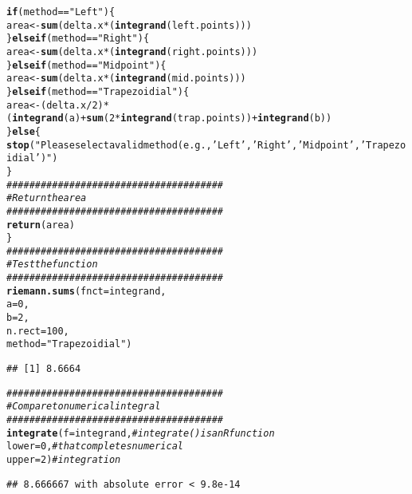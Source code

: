 \documentclass{article}\usepackage[]{graphicx}\usepackage[]{xcolor}
\makeatletter
\newcommand{\hlnum}[1]{\textcolor[rgb]{0.686,0.059,0.569}{#1}}%
\newcommand{\hlsng}[1]{\textcolor[rgb]{0.192,0.494,0.8}{#1}}%
\newcommand{\hlcom}[1]{\textcolor[rgb]{0.678,0.584,0.686}{\textit{#1}}}%
\newcommand{\hlopt}[1]{\textcolor[rgb]{0,0,0}{#1}}%
\newcommand{\hldef}[1]{\textcolor[rgb]{0.345,0.345,0.345}{#1}}%
\newcommand{\hlkwa}[1]{\textcolor[rgb]{0.161,0.373,0.58}{\textbf{#1}}}%
\newcommand{\hlkwb}[1]{\textcolor[rgb]{0.69,0.353,0.396}{#1}}%
\newcommand{\hlkwc}[1]{\textcolor[rgb]{0.333,0.667,0.333}{#1}}%
\newcommand{\hlkwd}[1]{\textcolor[rgb]{0.737,0.353,0.396}{\textbf{#1}}}%
\newenvironment{kframe}{%
 \def\at@end@of@kframe{}%
 \ifinner\ifhmode%
  \def\at@end@of@kframe{\end{minipage}}%
  \begin{minipage}{\columnwidth}%
 \fi\fi%
 \def\FrameCommand##1{\hskip\@totalleftmargin \hskip-\fboxsep
 \colorbox{shadecolor}{##1}\hskip-\fboxsep
     \hskip-\linewidth \hskip-\@totalleftmargin \hskip\columnwidth}%
 \MakeFramed {\advance\hsize-\width
   \@totalleftmargin\z@ \linewidth\hsize
   \@setminipage}}%
 {\par\unskip\endMakeFramed%
 \at@end@of@kframe}
\newenvironment{knitrout}{}{} %
\makeatother
\begin{document}
\begin{enumerate}
\begin{enumerate}
\begin{knitrout}
\begin{kframe}
\begin{alltt}
  \hlkwa{if}\hldef{(method} \hlopt{==} \hlsng{"Left"}\hldef{)\{}
     \hldef{area} \hlkwb{<-} \hlkwd{sum}\hldef{(delta.x}\hlopt{*}\hldef{(}\hlkwd{integrand}\hldef{(left.points)))}
  \hldef{\}}\hlkwa{else if}\hldef{(method} \hlopt{==} \hlsng{"Right"}\hldef{)\{}
     \hldef{area} \hlkwb{<-} \hlkwd{sum}\hldef{(delta.x}\hlopt{*}\hldef{(}\hlkwd{integrand}\hldef{(right.points)))}
  \hldef{\}}\hlkwa{else if}\hldef{(method} \hlopt{==} \hlsng{"Midpoint"}\hldef{)\{}
     \hldef{area} \hlkwb{<-} \hlkwd{sum}\hldef{(delta.x}\hlopt{*}\hldef{(}\hlkwd{integrand}\hldef{(mid.points)))}
  \hldef{\}}\hlkwa{else if}\hldef{(method} \hlopt{==} \hlsng{"Trapezoidial"}\hldef{)\{}
     \hldef{area} \hlkwb{<-} \hldef{(delta.x}\hlopt{/}\hlnum{2}\hldef{)}\hlopt{*}\hldef{(}\hlkwd{integrand}\hldef{(a)}\hlopt{+}\hlkwd{sum}\hldef{(}\hlnum{2}\hlopt{*}\hlkwd{integrand}\hldef{(trap.points))}\hlopt{+}\hlkwd{integrand}\hldef{(b))}
  \hldef{\}}\hlkwa{else}\hldef{\{}
    \hlkwd{stop}\hldef{(}\hlsng{"Please select a valid method (e.g., 'Left', 'Right', 'Midpoint', 'Trapezoidial')"}\hldef{)}
  \hldef{\}}
  \hlcom{######################################}
  \hlcom{# Return the area}
  \hlcom{######################################}
  \hlkwd{return}\hldef{(area)}
\hldef{\}}
\hlcom{######################################}
\hlcom{# Test the function}
\hlcom{######################################}
\hlkwd{riemann.sums}\hldef{(}\hlkwc{fnct} \hldef{= integrand,}
             \hlkwc{a} \hldef{=} \hlnum{0}\hldef{,}
             \hlkwc{b} \hldef{=} \hlnum{2}\hldef{,}
             \hlkwc{n.rect} \hldef{=} \hlnum{100}\hldef{,}
             \hlkwc{method} \hldef{=} \hlsng{"Trapezoidial"}\hldef{)}
\end{alltt}
\begin{verbatim}
## [1] 8.6664
\end{verbatim}
\begin{alltt}
\hlcom{######################################}
\hlcom{# Compare to numerical integral}
\hlcom{######################################}
\hlkwd{integrate}\hldef{(}\hlkwc{f} \hldef{= integrand,} \hlcom{# integrate() is an R function}
          \hlkwc{lower} \hldef{=} \hlnum{0}\hldef{,}     \hlcom{# that completes numerical}
          \hlkwc{upper} \hldef{=} \hlnum{2}\hldef{)}     \hlcom{# integration}
\end{alltt}
\begin{verbatim}
## 8.666667 with absolute error < 9.8e-14
\end{verbatim}
\end{kframe}
\end{knitrout}
\end{enumerate}
\end{enumerate}


\end{document}
